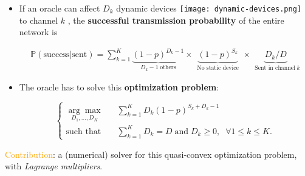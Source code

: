 \begin{frameO}

    \begin{itemize}
        \item
              If an oracle can affect \(D_k\) dynamic devices \texttt{[image: dynamic-devices.png]}  to channel
              \(k\) \slotmachine{}, the \textbf{successful transmission probability} of the entire network is
              \vspace*{-5pt}
              \begin{small} \begin{align*}
                      \mathbb{P}(\text{success}|\text{sent}) = \sum_{k=1}^{K} \underbrace{(1 - p)^{D_k - 1}}_{\;\;D_k - 1 \;\text{others}\;\;} \times \underbrace{(1 - p)^{S_k}}_{\;\;\text{No static device}\;\;} \times \underbrace{ D_k / D }_{\;\;\text{Sent in channel}\; k}
                  \end{align*} \end{small}
              \pause
        \item
              The oracle has to solve this \textbf{optimization problem}:
              \vspace*{-5pt}
              \begin{small} \begin{equation*} \begin{cases}
                          \underset{D_1,\dots,D_{K}}{\arg\max}\;\;\; & \sum\limits_{k=1}^{K} D_k (1 - p)^{S_k + D_k -1}                                           \\
                          \text{such that}\;\;\;                     & \sum\limits_{k=1}^{K} D_k = D \; \text{and} \; D_k \geq 0, \; \; \forall 1 \leq k \leq K .
                      \end{cases} \end{equation*} \end{small}
    \end{itemize}
    \vspace*{5pt}
    \begin{colorblock}{}
        \textcolor{orange}{Contribution}:
        a (numerical) solver for this quasi-convex optimization problem, with \emph{Lagrange
        multipliers}.
    \end{colorblock}

\end{frameO}

